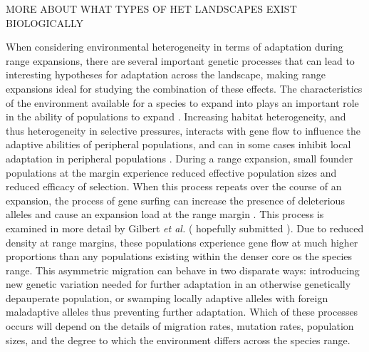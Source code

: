 MORE ABOUT WHAT TYPES OF HET LANDSCAPES EXIST BIOLOGICALLY


When considering environmental heterogeneity in terms of adaptation during range expansions, there are several important genetic processes that can lead to interesting hypotheses for adaptation across the landscape, making range expansions ideal for studying the combination of these effects. 
The characteristics of the environment available for a species to expand into plays an important role in the ability of populations to expand \citep{Aguilee:2012, Barton:2001, Pease:1989}. Increasing habitat heterogeneity, and thus heterogeneity in selective pressures, interacts with gene flow to influence the adaptive abilities of peripheral populations, and can in some cases inhibit local adaptation in peripheral populations \citep{Slatkin:1987,Kirkpatrick:1997, Ronce:2001}. During a range expansion, small founder populations at the margin experience reduced effective population sizes and reduced efficacy of selection. When this process repeats over the course of an expansion, the process of gene surfing \citep{Klopfstein:2006} can increase the presence of deleterious alleles and cause an expansion load at the range margin \citep{Peischl:2013}. This process is examined in more detail by Gilbert \emph{et al.} (\color{red} \footnotesize hopefully submitted \normalsize \color{black}). %
Due to reduced density at range margins, these populations experience gene flow at much higher proportions than any populations existing within the denser core os the species range. This asymmetric migration can behave in two disparate ways: introducing new genetic variation needed for further adaptation in an otherwise genetically depauperate population, or swamping locally adaptive alleles with foreign maladaptive alleles thus preventing further adaptation. Which of these processes occurs will depend on the details of migration rates, mutation rates, population sizes, and the degree to which the environment differs across the species range.


